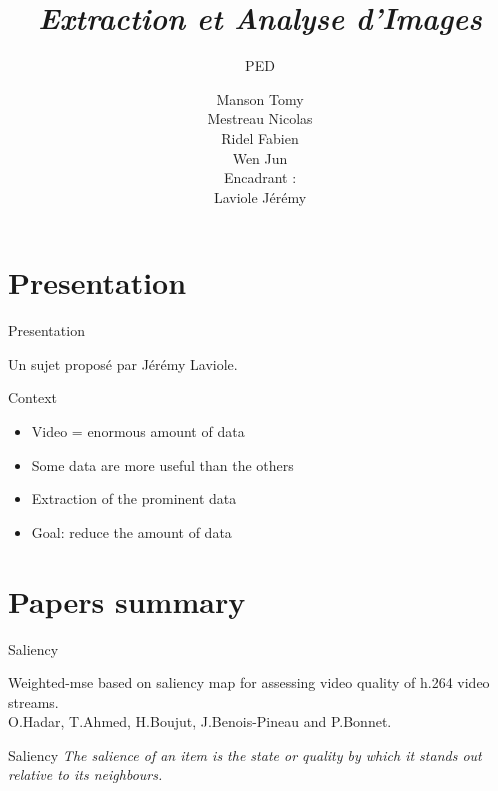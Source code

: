\documentclass[t,14pt]{beamer}
\title{\textbf{\textit{Extraction et Analyse d'Images}}}
\subtitle{PED}
\author{\scriptsize{Manson Tomy\\
		Mestreau Nicolas\\
		Ridel Fabien\\
		Wen Jun\\
		\vspace{10mm}
		Encadrant : \\
		Laviole Jérémy\\
		}}
\institute{\tiny Université de Bordeaux 1}
\begin{document}
\frame{\titlepage}

\section[Presentation]{Presentation}

\begin{frame}{Presentation}
\begin{center}
Un sujet proposé par Jérémy Laviole.
\vspace{2mm}
\end{center}
\end {frame}

\begin{frame}{Context}
\vspace{5mm}
\begin{itemize}[<+->]
\item Video = enormous amount of data
\item Some data are more useful than the others
\item Extraction of the prominent data
\item Goal: reduce the amount of data
\end{itemize}
\end{frame}

\section[Papers summary]{Papers summary}
\begin{frame}{Saliency}
\vspace{5mm}
\begin{center}
Weighted-mse based on saliency map for assessing video quality of h.264 video streams.\\
\vspace{5mm}
O.Hadar, T.Ahmed, H.Boujut, J.Benois-Pineau and P.Bonnet.
\end{center}
\end{frame}

\begin{frame}{Saliency}
\vspace{5mm}
\textit{The salience of an item is the state or quality by which it stands out relative to its neighbours.}
\vspace{5mm}
\end{frame}
\end{document}
